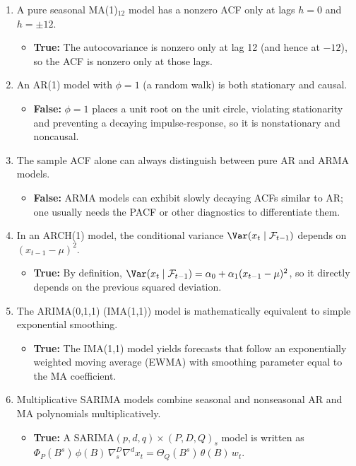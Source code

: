\documentclass[11pt]{article}
\begin{document}
\begin{enumerate}
  \item A pure seasonal MA(1)$_{12}$ model has a nonzero ACF only at lags $h=0$ and $h=\pm12$.
  \begin{itemize}
    \item \textbf{True:} The autocovariance is nonzero only at lag 12 (and hence at $-12$), so the ACF is nonzero only at those lags.
  \end{itemize}

  \item An AR(1) model with $\phi=1$ (a random walk) is both stationary and causal.
  \begin{itemize}
    \item \textbf{False:} $\phi=1$ places a unit root on the unit circle, violating stationarity and preventing a decaying impulse-response, so it is nonstationary and noncausal.
  \end{itemize}

  \item The sample ACF alone can always distinguish between pure AR and ARMA models.
  \begin{itemize}
    \item \textbf{False:} ARMA models can exhibit slowly decaying ACFs similar to AR; one usually needs the PACF or other diagnostics to differentiate them.
  \end{itemize}

  \item In an ARCH(1) model, the conditional variance $\Var(x_t\mid \mathcal F_{t-1})$ depends on $(x_{t-1}-\mu)^2$.
  \begin{itemize}
    \item \textbf{True:} By definition, $\Var(x_t\mid \mathcal F_{t-1})=\alpha_0+\alpha_1(x_{t-1}-\mu)^2$, so it directly depends on the previous squared deviation.
  \end{itemize}

  \item The ARIMA(0,1,1) (IMA(1,1)) model is mathematically equivalent to simple exponential smoothing.
  \begin{itemize}
    \item \textbf{True:} The IMA(1,1) model yields forecasts that follow an exponentially weighted moving average (EWMA) with smoothing parameter equal to the MA coefficient.
  \end{itemize}
  
  \item Multiplicative SARIMA models combine seasonal and nonseasonal AR and MA polynomials multiplicatively.
  \begin{itemize}
    \item \textbf{True:} A SARIMA\((p,d,q)\times(P,D,Q)_s\) model is written as \(\Phi_P(B^s)\,\phi(B)\,\nabla_s^D\nabla^d x_t = \Theta_Q(B^s)\,\theta(B)\,w_t\).
  \end{itemize}


\end{enumerate}
\end{document}
